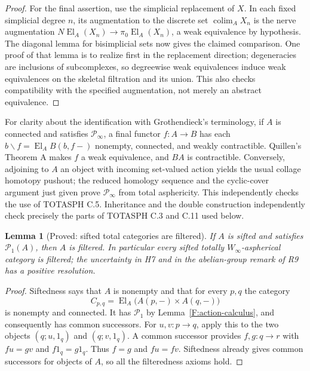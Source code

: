 \documentclass[11pt,a4paper]{article}
\newtheorem{lemma}[theorem]{Lemma}
\theoremstyle{definition}
\theoremstyle{remark}
\newcommand{\Winfty}{W_\infty}
\newcommand{\El}{\operatorname{El}}
\newcommand{\colim}{\operatorname*{colim}}
\begin{document}
\begin{proof}
For the final assertion, use the simplicial replacement of $X$.
In each fixed simplicial degree $n$, its augmentation to the discrete
set $\colim_A X_n$ is the nerve augmentation
$N\El_A(X_n)\to\pi_0\El_A(X_n)$, a weak equivalence by hypothesis.
The diagonal lemma for bisimplicial sets now gives the claimed
comparison.  One proof of that lemma is to realize first in the
replacement direction; degeneracies are inclusions of subcomplexes,
so degreewise weak equivalences induce weak equivalences on the
skeletal filtration and its union.  This also checks compatibility
with the specified augmentation, not merely an abstract equivalence.
\end{proof}

For clarity about the identification with Grothendieck's terminology,
if $A$ is connected and satisfies $\mathcal P_\infty$, a final functor
$f:A\to B$ has each $b\backslash f=\El_A B(b,f-)$ nonempty,
connected, and weakly contractible.  Quillen's Theorem A makes $f$ a
weak equivalence, and $BA$ is contractible.  Conversely, adjoining
to $A$ an object with incoming set-valued action yields the usual
collage homotopy pushout; the reduced homology sequence and the
cyclic-cover argument just given prove $\mathcal P_\infty$ from total
asphericity.  This independently checks the use of TOTASPH C.5.
Inheritance and the double construction independently check precisely
the parts of TOTASPH C.3 and C.11 used below.

\begin{lemma}[Proved: sifted total categories are filtered]
\label{F:sifted-total}
If $A$ is sifted and satisfies $\mathcal P_1(A)$, then $A$ is filtered.
In particular every sifted totally $\Winfty$-aspherical category is
filtered; the uncertainty in H7 and in the abelian-group remark of R9
has a positive resolution.
\end{lemma}
\begin{proof}
Siftedness says that $A$ is nonempty and that for every $p,q$ the
category
\[
 C_{p,q}=\El_A\bigl(A(p,-)\times A(q,-)\bigr)
\]
is nonempty and connected.  It has $\mathcal P_1$ by
Lemma~\ref{F:action-calculus}, and consequently has common successors.
For $u,v:p\to q$, apply this to the two objects
$(q;u,1_q)$ and $(q;v,1_q)$.  A common successor provides
$f,g:q\to r$ with $fu=gv$ and $f1_q=g1_q$.
Thus $f=g$ and $fu=fv$.  Siftedness already gives common successors
for objects of $A$, so all the filteredness axioms hold.
\end{proof}
\end{document}
